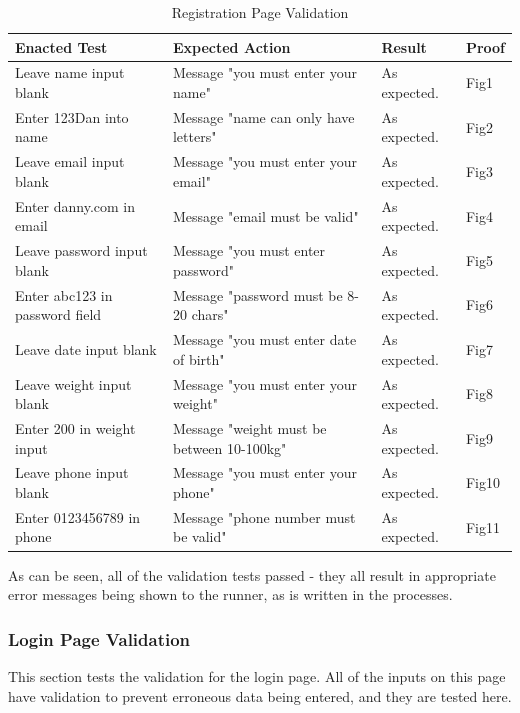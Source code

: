 \documentclass{article}[12pt,a4paper]
\begin{document}
\begin{table}[h]
\begin{tabular}{|l|l|l|l|}
\hline
\textbf{Enacted Test}          & \textbf{Expected Action}                  & \textbf{Result} & \textbf{Proof} \\ \hline
Leave name input blank         & Message "you must enter your name"        & As expected.    & Fig1           \\ \hline
Enter 123Dan into name         & Message "name can only have letters"      & As expected.    & Fig2           \\ \hline
Leave email input blank        & Message "you must enter your email"       & As expected.    & Fig3           \\ \hline
Enter danny.com in email       & Message "email must be valid"             & As expected.    & Fig4           \\ \hline
Leave password input blank     & Message "you must enter password"         & As expected.    & Fig5           \\ \hline
Enter abc123 in password field & Message "password must be 8-20 chars"     & As expected.    & Fig6           \\ \hline
Leave date input blank         & Message "you must enter date of birth"    & As expected.    & Fig7           \\ \hline
Leave weight input blank       & Message "you must enter your weight"      & As expected.    & Fig8           \\ \hline
Enter 200 in weight input      & Message "weight must be between 10-100kg" & As expected.    & Fig9           \\ \hline
Leave phone input blank        & Message "you must enter your phone"       & As expected.    & Fig10          \\ \hline
Enter 0123456789 in phone      & Message "phone number must be valid"      & As expected.    & Fig11          \\ \hline
\end{tabular}
\caption{Registration Page Validation}
\end{table}

As can be seen, all of the validation tests passed - they all result in appropriate error messages being shown to the runner, as is written in the processes.

\clearpage

\subsubsection{Login Page Validation}
This section tests the validation for the login page. All of the inputs on this page have validation to prevent erroneous data being entered, and they are tested here.
\end{document}
